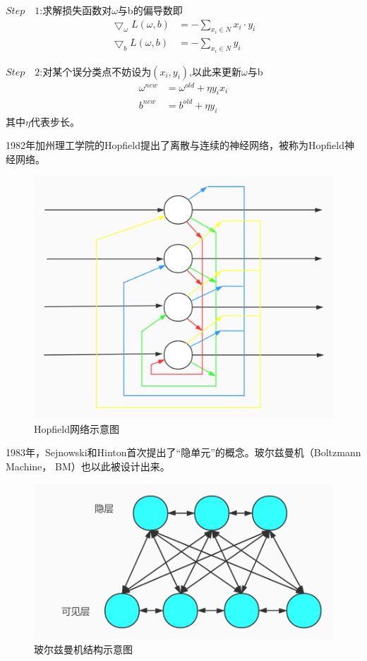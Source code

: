 \par
$Step \quad 1$:求解损失函数对$\omega$与b的偏导数即
\begin{align}
    \bigtriangledown_\omega L(\omega,b) &= -\sum_{x_i \in N} x_i \cdot y_i \\
    \bigtriangledown_b L(\omega,b) &= -\sum_{x_i \in N} y_i
\end{align}
\par
$Step \quad 2$:对某个误分类点不妨设为$(x_i,y_i)$,以此来更新$\omega$与b
\begin{align}
    \omega^{new} &= \omega^{old} + \eta y_i x_i \label{gxo}\\ %
    b^{new} &= b^{old} + \eta y_i \label{gxb} %
\end{align}
其中$\eta$代表步长。
\par
1982年加州理工学院的Hopfield提出了离散与连续的神经网络，被称为Hopfield神经网络。
\begin{figure}[htbp]
    \centering
    \includegraphics[width=13cm]{figure/Hopfield.jpg}
    \caption{Hopfield网络示意图}
    \label{fig-Hop}
\end{figure}
\par
1983年，Sejnowski和Hinton首次提出了“隐单元”的概念。玻尔兹曼机（Boltzmann Machine， BM）也以此被设计出来。
\begin{figure}[htbp]
    \centering
    \includegraphics[width=13cm]{figure/BM.jpg}
    \caption{玻尔兹曼机结构示意图}
    \label{fig-BM}
\end{figure}
